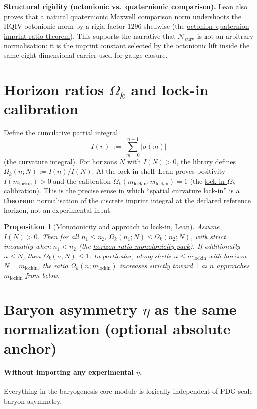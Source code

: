 \documentclass[11pt]{amsart}
\newcommand{\LeanEng}[2]{\hyperref[#1]{#2}}
\newtheorem{proposition}[theorem]{Proposition}
\begin{document}
\medskip
\noindent\textbf{Structural rigidity (octonionic vs.\ quaternionic comparison).}
Lean also proves that a natural quaternionic Maxwell comparison norm
undershoots the HQIV octonionic norm by a rigid factor $1296$ shellwise
(the \LeanEng{lean:deltaE-1296}{octonion--quaternion imprint ratio
theorem}). This supports the narrative that $\mathcal{N}_{\mathrm{curv}}$
is not an arbitrary normalisation: it is the imprint constant selected by
the octonionic lift inside the same eight-dimensional carrier used for
gauge closure.

\section{Horizon ratios \(\Omega_k\) and lock-in calibration}

Define the cumulative partial integral
\[
I(n) \;:=\; \sum_{m=0}^{n-1} |\sigma(m)|
\]
(the \LeanEng{lean:curvature-integral}{curvature integral}). For horizons
$N$ with $I(N)>0$, the library defines
$\Omega_k(n;N):=I(n)/I(N)$. At the lock-in shell, Lean proves positivity
$I(m_{\mathrm{lockin}})>0$ and the calibration
$\Omega_k(m_{\mathrm{lockin}};m_{\mathrm{lockin}})=1$ (the
\LeanEng{lean:omega-k-lockin}{lock-in $\Omega_k$ calibration}). This is
the precise sense in which ``spatial curvature lock-in'' is a
\textbf{theorem}: normalisation of the discrete imprint integral at the
declared reference horizon, not an experimental input.

\begin{proposition}[Monotonicity and approach to lock-in, Lean]
\label{prop:mono-lockin}
Assume $I(N)>0$. Then for all $n_1\le n_2$,
$\Omega_k(n_1;N)\le \Omega_k(n_2;N)$, with strict inequality when
$n_1<n_2$ (the \LeanEng{lean:omega-k-mono}{horizon-ratio monotonicity
pack}). If additionally $n\le N$, then $\Omega_k(n;N)\le 1$. In
particular, along shells $n\le m_{\mathrm{lockin}}$ with horizon
$N=m_{\mathrm{lockin}}$, the ratio $\Omega_k(n;m_{\mathrm{lockin}})$
increases strictly toward $1$ as $n$ approaches $m_{\mathrm{lockin}}$
from below.
\end{proposition}

\section{Baryon asymmetry \(\eta\) as the same normalization (optional absolute anchor)}

\paragraph{Without importing any experimental $\eta$.}
Everything in the baryogenesis core module is logically independent of
PDG-scale baryon asymmetry.
\end{document}
